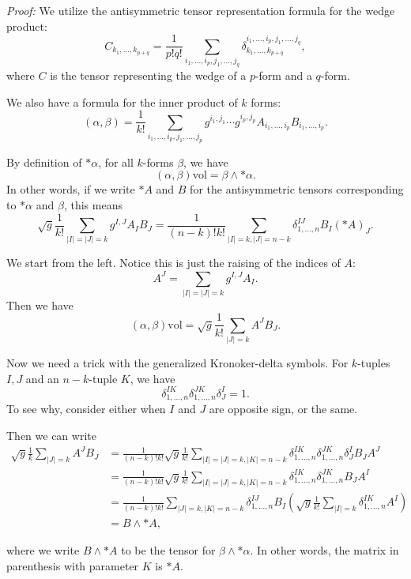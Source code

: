 \documentclass[12pt, reqno]{extarticle}
\theoremstyle{plain}
\theoremstyle{definition}
\theoremstyle{remark}
\begin{document}
\begin{enumerate}
    \textit{Proof:} We utilize the antisymmetric tensor representation formula for the wedge
    product:
    \[
        C_{k_1,\dots, k_{p+q}} = \frac{1}{p!q!}\sum_{i_1,\dots, i_p, j_1, \dots, j_q}
        \delta_{k_1, \dots, k_{p+q}}^{i_1,\dots, i_p, j_1,\dots, j_q},
    \]
    where $C$ is the tensor representing the wedge of a $p$-form and a $q$-form.

    We also have a formula for the inner product of $k$ forms:
    \[
        (\alpha,\beta) = \frac{1}{k!}\sum_{i_1, \dots, i_p, j_1, \dots, j_p}g^{i_1, j_1}\cdots g^{i_p, j_p}
        A_{i_1, \dots, i_p}B_{i_1, \dots, i_p}.
    \]

    By definition of $*\alpha$, for all $k$-forms $\beta$, we have
    \[
        (\alpha,\beta)\text{vol} = \beta \wedge *\alpha.
    \]
    In other words, if we write $*A$ and $B$ for the antisymmetric tensors corresponding to 
    $*\alpha$ and $\beta$, this means
    \[
        \sqrt{g}\frac{1}{k!}\sum_{|I|=|J|=k}g^{I,J}A_I B_J 
        = \frac{1}{(n-k)!k!}\sum_{|I|=k,|J|=n-k}\delta^{IJ}_{1,\dots, n}B_I (*A)_J.
    \]

    We start from the left. Notice this is just the raising of the indices of $A$:
    \[
        A^J = \sum_{|I| = |J| = k}g^{I,J}A_I.
    \]
    Then we have 
    \[
        (\alpha,\beta)\text{vol} = \sqrt{g}\frac{1}{k!}\sum_{|J| = k}A^J B_J.
    \]

    Now we need a trick with the generalized Kronoker-delta symbols. For 
    $k$-tuples $I,J$ and an $n-k$-tuple $K$, we have
    \[
        \delta^{IK}_{1,\dots,n}\delta^{JK}_{1,\dots,n}\delta^I_J = 1.
    \]
    To see why, consider either when $I$ and $J$ are opposite sign, 
    or the same.

    Then we can write
    \begin{align*}
        \sqrt{g}\frac{1}{k}\sum_{|J| = k}A^J B_J
        & = \frac{1}{(n-k)!k!}\sqrt{g}\frac{1}{k!}
        \sum_{|I|=|J|=k, |K|=n-k}\delta^{IK}_{1,\dots,n}\delta^{JK}_{1,\dots,n}\delta^I_J
        B_J A^J\\
        & = \frac{1}{(n-k)!k!}\sqrt{g}\frac{1}{k!} \sum_{|I|=|J|=k, |K|=n-k}
        \delta^{IK}_{1,\dots,n}\delta^{JK}_{1,\dots,n}B_J A^I\\
        & = \frac{1}{(n-k)!k!} \sum_{|J|=k, |K|= n-k}\delta^{IJ}_{1,\dots,n} B_I
        \left(\sqrt{g}\frac{1}{k!}\sum_{|I|=k}\delta^{IK}_{1,\dots,n}A^I\right)\\
        & = B\wedge *A,
    \end{align*}

    where we write $B \wedge *A$ to be the tensor for $\beta\wedge *\alpha$. In other words,
    the matrix in parenthesis with parameter $K$ is $*A$. 
\end{enumerate}
\end{document}
